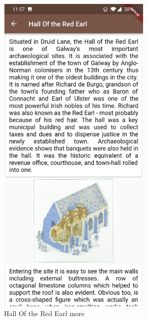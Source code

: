 \begin{figure}[ht!]
    \centering
 \includegraphics[width=75mm,height=162mm]{img/HallRedEarlMore.jpg}
\caption{Hall Of the Red Earl more}
\label{fig:Hall Of the Red Earl more}
\end{figure}


